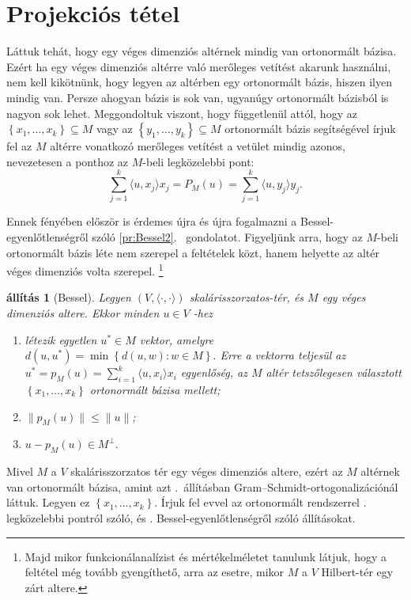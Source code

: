 \documentclass[9pt, a4paper, showtrims]{memoir}
\makeatletter
\renewenvironment{proof}[1][\proofname]
    {\par\pushQED{\qed}%
    \normalfont \topsep6\p@\@plus6\p@\relax
    \trivlist
    \item[\hskip\labelsep
        \itshape
    #1\@addpunct{:}]\ignorespaces}
    {\popQED\endtrivlist\@endpefalse}
\theoremstyle{plain}
\newtheorem{proposition}{állítás}[chapter]
\theoremstyle{remark}
\theoremstyle{definition}
\newcommand{\ip}[2]{\langle#1,#2\rangle}
\makeatother
\begin{document}
\section{Projekciós tétel}
Láttuk tehát, hogy egy véges dimenziós altérnek mindig van ortonormált bázisa.
Ezért ha egy véges dimenziós altérre való merőleges vetítést akarunk használni,
nem kell kikötnünk, hogy legyen az altérben egy ortonormált bázis, hiszen ilyen mindig van.
Persze ahogyan bázis is sok van, ugyanúgy ortonormált bázisból is nagyon sok lehet.
Meggondoltuk viszont, hogy függetlenül attól, hogy az $\left\{ x_1,\dots,x_k \right\}\subseteq M$ 
vagy az $\left\{ y_1,\dots,y_k \right\}\subseteq M$ ortonormált bázis segítségével írjuk fel az $M$
altérre vonatkozó merőleges vetítést a vetület mindig azonos, nevezetesen a ponthoz az $M$-beli legközelebbi pont:
\[
    \sum_{j=1}^{k}\ip{u}{x_j}x_j
    =
    P_M\left( u \right)
    =
    \sum_{j=1}^{k}\ip{u}{y_j}y_j.
\]

Ennek fényében először is érdemes újra és újra fogalmazni a Bessel-egyenlőtlenségről szóló \ref{pr:Bessel2}.~ gondolatot.
Figyeljünk arra, hogy az $M$-beli ortonormált bázis léte nem szerepel a feltételek közt,
hanem helyette az altér véges dimenziós volta szerepel.%
\footnote{Majd mikor funkcionálanalízist és mértékelméletet tanulunk látjuk, hogy a feltétel még tovább gyengíthető,
arra az esetre, mikor $M$ a $V$ Hilbert-tér egy zárt altere.}
\begin{proposition}[Bessel]\label{pr:Bessel3}
    Legyen $\left( V,\ip{\cdot}{\cdot} \right)$ skalárisszorzatos-tér, és $M$ egy 
    véges dimenziós altere.
    Ekkor minden $u\in V$ -hez
    \begin{enumerate}
        \item létezik egyetlen $u^\ast\in M$ vektor, amelyre
        \(
        d\left( u,u^\ast\right)
        =
        \min\left\{ d\left( u,w \right):w\in M \right\}.
        \)
        Erre a vektorra teljesül az $u^\ast=p_M\left( u \right)=\sum_{i=1}^k\ip{u}{x_i}x_i$ egyenlőség, 
        az $M$ altér tetszőlegesen választott  $\left\{ x_1,\dots,x_k \right\}$ ortonormált bázisa mellett;
        \item
            $\|p_M\left( u \right)\|\leq\|u\|$;
        \item
            \(
            u-p_M(u)\in M^\perp.
            \) 
            \qedhere
    \end{enumerate}
\end{proposition}
\begin{proof}
    Mivel $M$ a $V$ skalárisszorzatos tér egy véges dimenziós altere, 
    ezért az $M$ altérnek van
    ortonormált bázisa, amint azt .~állításban Gram--Schmidt-ortogonalizációnál láttuk.
    Legyen ez $\left\{ x_1,\dots,x_k \right\}$. 
    Írjuk fel evvel az ortonormált rendszerrel . legközelebbi pontról szóló, 
    és . Bessel-egyen\-lőt\-lenség\-ről szóló állításokat.
\end{proof}
\end{document}
